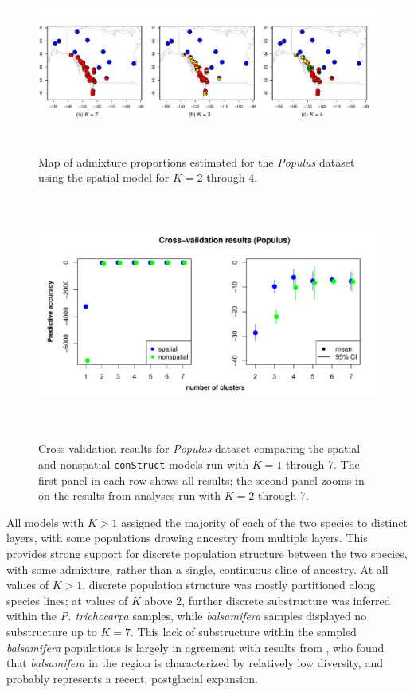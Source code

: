 \documentclass[12pt]{article}
\newcommand{\bals}{\textit{balsamifera}}
\begin{document}
\begin{figure}
	\centering
		{\includegraphics[width=6in,height=2in]{figs/populus/Fig4_pop_sp_results.pdf}}
	\caption{
	Map of admixture proportions estimated for the \textit{Populus} dataset 
	using the spatial model for $K=2$ through 4.
    }\label{populus_pies}
\end{figure}

\begin{figure}
	\centering
		{\includegraphics[width=6in,height=3in]{figs/populus/populus_std_xval.pdf}}
	\caption{
	Cross-validation results for \textit{Populus} dataset 
	comparing the spatial and nonspatial \texttt{conStruct} models run with $K=1$ through 7.  
	The first panel in each row shows all results; 
	the second panel zooms in on the results from analyses run with $K = 2$ through 7.
    }\label{populus_xvals}
\end{figure}

All models with $K>1$ assigned the majority of each of the two species
to distinct layers, with some populations drawing ancestry from multiple layers.
This provides strong support for discrete population structure between the two species,
with some admixture,
rather than a single, continuous cline of ancestry.
At all values of $K>1$, discrete population structure was mostly partitioned along species lines; 
at values of $K$ above 2, further discrete substructure was inferred within the \textit{P. trichocarpa} samples, 
while \bals{} samples displayed no substructure up to $K=7$.
This lack of substructure within the sampled \bals{} populations is largely in agreement with results from 
\citet{keller_etal_2010}, who found that \bals{} in the region is characterized by relatively low diversity, 
and probably represents a recent, postglacial expansion.
\end{document}
